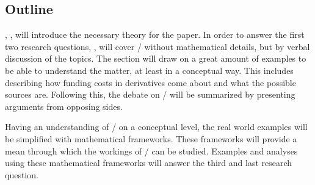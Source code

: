 \documentclass[main.tex]{subfiles}
\begin{document}
    \subsection{Outline}

    , , 
    will introduce the necessary theory for the paper.
    In order to answer the first two research questions,
    ,  
    will cover \FVA/ without mathematical details, but by verbal discussion of the topics.
    The section will draw on a great amount of examples to be able to understand the matter, 
    at least in a conceptual way.
    This includes describing how funding costs in derivatives come about 
    and what the possible sources are.
    Following this, the debate on \FVA/ will be summarized
    by presenting arguments from opposing sides.

    Having an understanding of \FVA/ on a conceptual level,
    the real world examples will be simplified with mathematical frameworks.
    These frameworks will provide a mean through which the workings of \FVA/ can be studied.
    Examples and analyses using these mathematical frameworks
    will answer the third and last research question.
\end{document}
